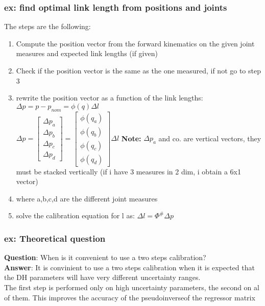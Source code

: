 \documentclass[a4paper,12pt]{article}
\begin{document}
\subsubsection{ex: find optimal link length from positions and joints}
The steps are the following:
\begin{enumerate}
    \item Compute the position vector from the forward kinematics on the given 
    joint measures and expected link lengths (if given)
    \item Check if the position vector is the same as the one
     measured, if not go to step 3
    \item rewrite the position vector as a function of the link 
    lengths:\\ 
    $\Delta p = p - p_{nom} = \phi(q) \Delta l$ \\
    $\Delta p = \begin{bmatrix}
        \Delta p_a\\
        \Delta p_b \\
        \Delta p_c \\ \Delta p_d
    \end{bmatrix} =
    \begin{bmatrix}
        \phi (q_a)\\
         \phi(q_b) \\
          \phi(q_c) \\ \phi(q_d)
    \end{bmatrix} \Delta l$ 
    \textbf{Note:} $\Delta p_a$ and co. are vertical vectors, they must 
    be stacked vertically (if i have 3 measures in 2 dim, i obtain a 6x1 vector)
    \item where a,b,c,d are the different joint measures 
    \item solve the calibration equation for l as: $\Delta l =  \Phi^{\#} \Delta p$
\end{enumerate}
\subsubsection{ex: Theoretical question}
\textbf{Question}: When is it convenient to use a two steps calibration?\\
\textbf{Answer}: It is convinient to use a two steps calibration when it is expected
 that the DH parameters will have very different uncertainty ranges. \\
 The first step is performed only on high uncertainty parameters, the second on al of them.
 This improves the accuracy of the pseudoinverseof the regressor matrix
\end{document}
